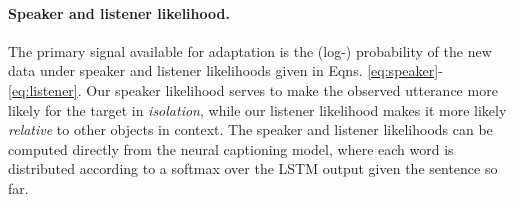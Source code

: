 \paragraph{Speaker and listener likelihood.} 
The primary signal available for adaptation is the (log-) probability of the new data under speaker and listener likelihoods given in Eqns. \ref{eq:speaker}-\ref{eq:listener}.
Our speaker likelihood serves to make the observed utterance more likely for the target in \emph{isolation}, while our listener likelihood makes it more likely \emph{relative} to other objects in context. %
The speaker and listener likelihoods can be computed directly from the neural captioning model, where each word is distributed according to a softmax over the LSTM output given the sentence so far.
%

